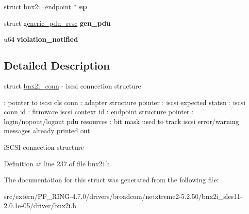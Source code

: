 \begin{DoxyCompactItemize}
\item 
\hypertarget{structbnx2i__conn_ad9a2d912f17b5dba220829a0ac684595}{
struct \hyperlink{structbnx2i__endpoint}{bnx2i\_\-endpoint} $\ast$ {\bfseries ep}}
\label{structbnx2i__conn_ad9a2d912f17b5dba220829a0ac684595}

\item 
\hypertarget{structbnx2i__conn_a071eacecc88e4e18fe6e864bd4573b17}{
struct \hyperlink{structgeneric__pdu__resc}{generic\_\-pdu\_\-resc} {\bfseries gen\_\-pdu}}
\label{structbnx2i__conn_a071eacecc88e4e18fe6e864bd4573b17}

\item 
\hypertarget{structbnx2i__conn_ac06db295c8d19f87f7f8d9bc6a602b2d}{
u64 {\bfseries violation\_\-notified}}
\label{structbnx2i__conn_ac06db295c8d19f87f7f8d9bc6a602b2d}

\end{DoxyCompactItemize}


\subsection{Detailed Description}
struct \hyperlink{structbnx2i__conn}{bnx2i\_\-conn} -\/ iscsi connection structure

: pointer to iscsi cls conn : adapter structure pointer : iscsi expected statsn : iscsi conn id : firmware iscsi context id : endpoint structure pointer : login/nopout/logout pdu resources : bit mask used to track iscsi error/warning messages already printed out

iSCSI connection structure 

Definition at line 237 of file bnx2i.h.



The documentation for this struct was generated from the following file:\begin{DoxyCompactItemize}
\item 
src/extern/PF\_\-RING-\/4.7.0/drivers/broadcom/netxtreme2-\/5.2.50/bnx2i\_\-sles11-\/2.0.1e-\/05/driver/bnx2i.h\end{DoxyCompactItemize}
